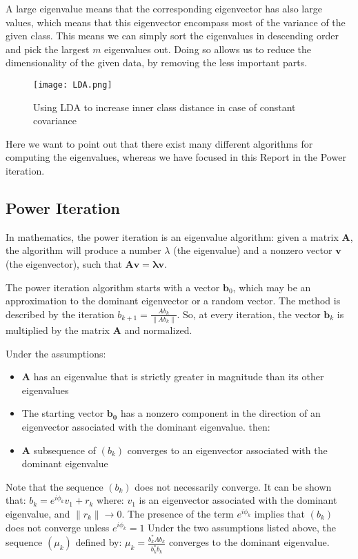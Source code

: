 A large eigenvalue means that the corresponding eigenvector has also large values, which means that this eigenvector encompass most of the variance of the given class. This means we can simply sort the eigenvalues in descending order and pick the largest $m$ eigenvalues out. Doing so allows us to reduce the dimensionality of the given data, by removing the less important parts.
\begin{figure}[h]
\centering
\texttt{[image: LDA.png]}
\caption{Using LDA to increase inner class distance in case of constant covariance }
\end{figure}

Here we want to point out that there exist many different algorithms for computing the eigenvalues, whereas we have focused in this Report in the Power iteration. 

\subsection{Power Iteration}
In mathematics, the power iteration is an eigenvalue algorithm: given a matrix $\mathbf{A}$, the algorithm will produce a number $\lambda$ (the eigenvalue) and a nonzero vector $\mathbf{v}$ (the eigenvector), such that $\mathbf{Av} = \mathbf{\lambda v}$.

The power iteration algorithm starts with a vector $\mathbf{b}_0$, which may be an approximation to the dominant eigenvector or a random vector. The method is described by the iteration $ b_{k+1} = \frac{Ab_k}{\|Ab_k\|}$.
So, at every iteration, the vector $\mathbf{b}_k$ is multiplied by the matrix $\mathbf{A}$ and normalized.

Under the assumptions:
\begin{itemize}
\item $\mathbf{A}$ has an eigenvalue that is strictly greater in magnitude than its other eigenvalues
\item The starting vector $\mathbf{b_{0}}$ has a nonzero component in the direction of an eigenvector associated with the dominant eigenvalue.
then:
\item $\mathbf{A}$ subsequence of $\left( b_{k} \right)$ converges to an eigenvector associated with the dominant eigenvalue
\end{itemize}

Note that the sequence $\left( b_{k} \right)$ does not necessarily converge. It can be shown that:
$b_{k} = e^{i \phi_{k}} v_{1} + r_{k}$ where: $v_{1}$ is an eigenvector associated with the dominant eigenvalue, and  $\| r_{k} \| \rightarrow 0$. The presence of the term $e^{i \phi_{k}}$ implies that $\left( b_{k} \right)$  does not converge unless $e^{i \phi_{k}} = 1$ Under the two assumptions listed above, the sequence $\left( \mu_{k} \right)$ defined by: $\mu_{k} = \frac{b_{k}^{*}Ab_{k}}{b_{k}^{*}b_{k}}$ converges to the dominant eigenvalue.

